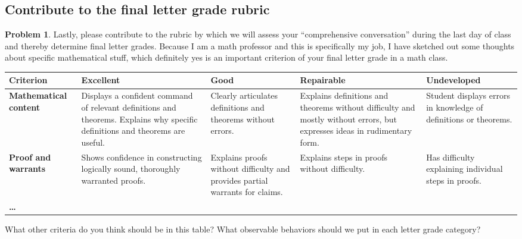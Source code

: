 \documentclass[12pt]{article}
\theoremstyle{definition} %
\newtheorem{problem}{Problem}
\begin{document}
\newpage
\begin{landscape}
  
\subsection*{Contribute to the final letter grade rubric}

\begin{problem}
  Lastly, please contribute to the rubric by which we will assess your ``comprehensive conversation'' during the last day of class and thereby determine final letter grades. Because I am a math professor and this is specifically my job, I have sketched out some thoughts about specific mathematical stuff, which definitely yes is an important criterion of your final letter grade in a math class.

  \bigskip

\begin{tabularx}{\linewidth}{|*{5}{>{\raggedright\arraybackslash}X|}}\hline
\textbf{Criterion}  
& \textbf{Excellent} 
& \textbf{Good} 
& \textbf{Repairable} 
& \textbf{Undeveloped}\\\hline
\textbf{Mathematical content} 
& %
Displays a confident command of relevant definitions and theorems. Explains why specific definitions and theorems are useful.
&   %
Clearly articulates definitions and theorems without errors.
&   %
Explains definitions and theorems without difficulty and mostly without errors, but expresses ideas in rudimentary form.
&   %
Student displays errors in knowledge of definitions or theorems.
\\\hline
\textbf{Proof and warrants} 
&   %
Shows confidence in constructing logically sound, thoroughly warranted proofs.
&   %
Explains proofs without difficulty and provides partial warrants for claims.
&   %
Explains steps in proofs without difficulty.
&   %
Has difficulty explaining individual steps in proofs.
\\\hline
\textbf{\ldots} 
&   %
&   %
&   %
&   %
\\\hline
\end{tabularx}

\bigskip

What other criteria do you think should be in this table? What observable behaviors should we put in each letter grade category?
\end{problem}

\end{landscape}
\end{document}
